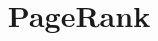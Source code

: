\documentclass{article}
\begin{document}
\title{PageRank}
\maketitle

\nocite{gallardo2005departamento}


\end{document}
